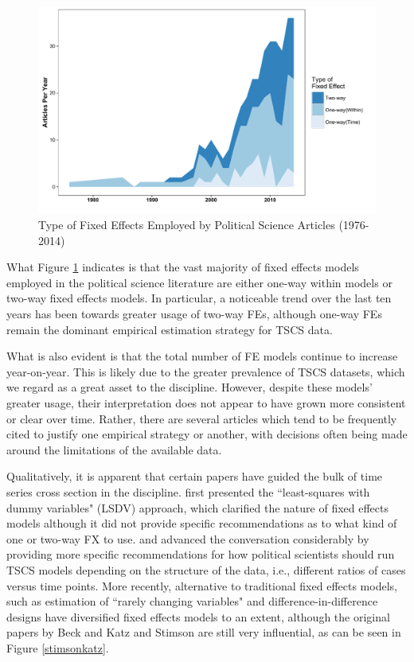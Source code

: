 \documentclass{article}[12pt]
\begin{document}
\begin{figure}
	\centering
	\includegraphics[width=\linewidth]{all_articles}
	\caption{Type of Fixed Effects Employed by Political Science Articles (1976-2014)}\label{allarticles}
\end{figure}

What Figure \ref{allarticles} indicates is that the vast majority of fixed effects models employed in the political science literature are either one-way within models or two-way fixed effects models. In particular, a noticeable trend over the last ten years has been towards greater usage of two-way FEs, although one-way FEs remain the dominant empirical estimation strategy for TSCS data.

What is also evident is that the total number of FE models continue to increase year-on-year. This is likely due to the greater prevalence of TSCS datasets, which we regard as a great asset to the discipline. However, despite these models' greater usage, their interpretation does not appear to have grown more consistent or clear over time. Rather, there are several articles which tend to be frequently cited to justify one empirical strategy or another, with decisions often being made around the limitations of the available data.

Qualitatively, it is apparent that certain papers have guided the bulk of time series cross section in the discipline. \textcite{stimson1985} first presented the ``least-squares with dummy variables" (LSDV) approach, which clarified the nature of fixed effects models although it did not provide specific recommendations as to what kind of one or two-way FX to use. \textcite{beckkatzturner1998} and \textcite{beckkatz1995} advanced the conversation considerably by providing more specific recommendations for how political scientists should run TSCS models depending on the structure of the data, i.e., different ratios of cases versus time points. More recently, alternative to traditional fixed effects models, such as estimation of ``rarely changing variables" \parencite{plumper2007} and difference-in-difference designs \parencite{abadie2005} have diversified fixed effects models to an extent, although the original papers by Beck and Katz and Stimson are still very influential, as can be seen in Figure \ref{stimsonkatz}.
\end{document}
